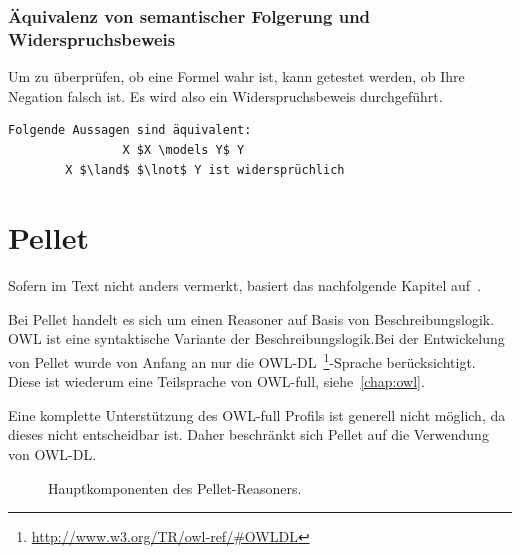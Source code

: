 \subsubsection{Äquivalenz von semantischer Folgerung und Widerspruchsbeweis}
\label{subsubsection:beschreibungslogik_widersp}
Um zu überprüfen, ob eine Formel wahr ist, kann getestet werden, ob Ihre Negation falsch ist. Es wird also ein Widerspruchsbeweis durchgeführt.
~\cite[vgl. S. 47]{laemmel}

\begin{lstlisting}[caption={Äquivalenz von semantischer Folgerung und Widerspruchsbeweis}]
		Folgende Aussagen sind äquivalent:
				X $X \models Y$ Y
		X $\land$ $\lnot$ Y ist widersprüchlich
\end{lstlisting}


\section{Pellet}
\label{sec:inferenz_pellet}
Sofern im Text nicht anders vermerkt, basiert das nachfolgende Kapitel auf~\cite{sirin:pellet05}.

Bei Pellet handelt es sich um einen Reasoner auf Basis von Beschreibungslogik. OWL ist eine syntaktische Variante der Beschreibungslogik.\@ Bei der Entwickelung von Pellet wurde von Anfang an nur die OWL-DL~\footnote{\url{http://www.w3.org/TR/owl-ref/\#OWLDL}}-Sprache berücksichtigt. Diese ist wiederum eine Teilsprache von OWL-full, siehe~\autoref{chap:owl}.

Eine komplette Unterstützung des OWL-full Profils ist generell nicht möglich, da dieses nicht entscheidbar ist. Daher beschränkt sich Pellet auf die Verwendung von OWL-DL\@.~\cite[S. 13]{sirin:pellet05}

\begin{figure}[htbp]
\centering {}
\caption{Hauptkomponenten des Pellet-Reasoners.\label{fig:pellet_komponenten}\protect\footnotemark}
\end{figure}

